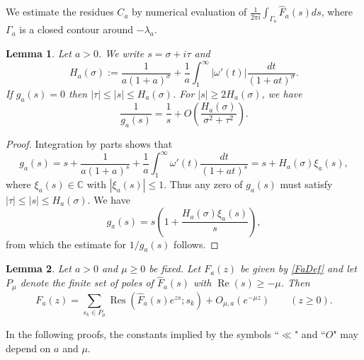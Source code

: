 \documentclass[11pt]{amsart}
\newtheorem{lemma}{Lemma}
\DeclareMathOperator{\re}{Re}
\DeclareMathOperator{\res}{Res}
\begin{document}
We estimate the residues $C_{a}$ by numerical evaluation of $\frac{1}{2\pi i}\int_{\Gamma_a} \widehat{F}_a(s)  ds$,
where $\Gamma_a$ is a closed contour around $-\lambda_{a}$.




\begin{lemma}\label{ga}
Let $a>0$.
We write $s=\sigma + i \tau$ and
$$ H_a(\sigma):=  \frac{1}{a (1+a)^\sigma} 
+\frac{1}{a} \int_1^\infty  |\omega'(t)| \frac{dt}{(1+at)^{\sigma}} .$$
If $g_a(s)=0$ then $|\tau| \le |s| \le H_a(\sigma)$. 
For $|s| \ge 2 H_a(\sigma)$, we have
$$ \frac{1}{g_a(s)}=\frac{1}{s} + O\left(\frac{H_a(\sigma)}{\sigma^2+\tau^2 } \right) .$$
\end{lemma}

\begin{proof}
Integration by parts shows that
\begin{equation}\label{gasomegaprime}
g_a(s) = s + \frac{1}{a (1+a)^s} 
+\frac{1}{a} \int_1^\infty  \omega'(t) \frac{dt}{(1+at)^{s}} 
 = s + H_a(\sigma) \xi_a(s),
\end{equation}
where $\xi_a(s) \in \mathbb{C}$ with  $|\xi_a(s)|\le 1$.
Thus any zero of $g_a(s)$ must satisfy $|\tau|\le |s| \le H_a(\sigma)$. 
We have
$$ g_a(s) = s \left(1+\frac{H_a(\sigma) \xi_a(s)}{s}\right),$$
from which the estimate for $1/g_a(s)$ follows.
\end{proof}

\begin{lemma}\label{FaInv}
Let $a>0$ and $\mu \ge 0$ be fixed. Let $F_a(z)$ be given by \eqref{FaDef} and 
let $P_\mu$ denote the finite set of poles of $\widehat{F}_a(s)$ with $\re(s)\ge -\mu$. 
Then 
$$
F_a(z) = \sum_{s_k \in P_\mu} \res(\widehat{F}_a(s) e^{zs}; s_k)+ O_{\mu,a}(e^{-\mu z}) \qquad (z\ge 0).
$$
\end{lemma}

In the following proofs, the constants implied by the symbols ``$\ll$" and ``$O$" may depend on $a$ and $\mu$.  
\end{document}
